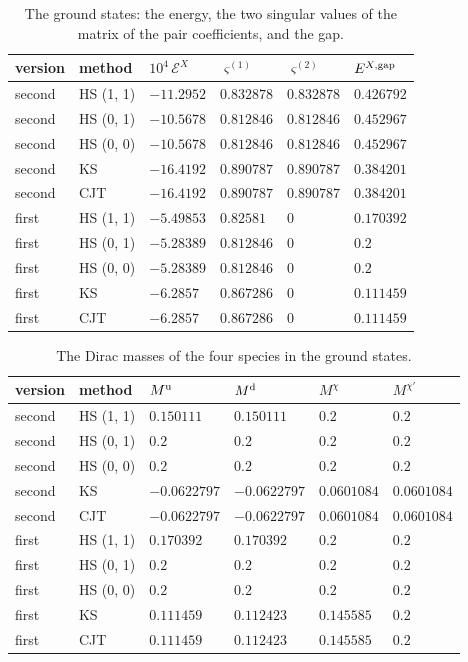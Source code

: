 \documentclass[aps,prd,onecolumn,superscriptaddress,nofootinbib,floatfix,longbibliography]{revtex4-2}
\begin{document}
\begin{table}[!htbp]
\caption{\label{tab:ground}The ground states: the energy, the two singular values of the matrix of the pair coefficients, and the gap.}
\begingroup\centering\footnotesize\setlength{\tabcolsep}{4pt}
\begin{tabular}{llllll}
\hline\hline
version & method & $10^4\,\mathcal E^X$ & $\varsigma^{(1)}$ & $\varsigma^{(2)}$ & $E^{X,{\rm gap}}$ \\ \hline
second & HS (1, 1) & $-11.2952$ & $0.832878$ & $0.832878$ & $0.426792$ \\
second & HS (0, 1) & $-10.5678$ & $0.812846$ & $0.812846$ & $0.452967$ \\
second & HS (0, 0) & $-10.5678$ & $0.812846$ & $0.812846$ & $0.452967$ \\
second & KS & $-16.4192$ & $0.890787$ & $0.890787$ & $0.384201$ \\
second & CJT & $-16.4192$ & $0.890787$ & $0.890787$ & $0.384201$ \\
first & HS (1, 1) & $-5.49853$ & $0.82581$ & $0$ & $0.170392$ \\
first & HS (0, 1) & $-5.28389$ & $0.812846$ & $0$ & $0.2$ \\
first & HS (0, 0) & $-5.28389$ & $0.812846$ & $0$ & $0.2$ \\
first & KS & $-6.2857$ & $0.867286$ & $0$ & $0.111459$ \\
first & CJT & $-6.2857$ & $0.867286$ & $0$ & $0.111459$ \\
\hline\hline
\end{tabular}\par
\endgroup
\end{table}

\begin{table}[!htbp]
\caption{\label{tab:sfmasses}The Dirac masses of the four species in the ground states.}
\begingroup\centering\footnotesize\setlength{\tabcolsep}{4pt}
\begin{tabular}{llllll}
\hline\hline
version & method & $M^{\rm u}$ & $M^{\rm d}$ & $M^\chi$ & $M^{\chi'}$ \\ \hline
second & HS (1, 1) & $0.150111$ & $0.150111$ & $0.2$ & $0.2$ \\
second & HS (0, 1) & $0.2$ & $0.2$ & $0.2$ & $0.2$ \\
second & HS (0, 0) & $0.2$ & $0.2$ & $0.2$ & $0.2$ \\
second & KS & $-0.0622797$ & $-0.0622797$ & $0.0601084$ & $0.0601084$ \\
second & CJT & $-0.0622797$ & $-0.0622797$ & $0.0601084$ & $0.0601084$ \\
first & HS (1, 1) & $0.170392$ & $0.170392$ & $0.2$ & $0.2$ \\
first & HS (0, 1) & $0.2$ & $0.2$ & $0.2$ & $0.2$ \\
first & HS (0, 0) & $0.2$ & $0.2$ & $0.2$ & $0.2$ \\
first & KS & $0.111459$ & $0.112423$ & $0.145585$ & $0.2$ \\
first & CJT & $0.111459$ & $0.112423$ & $0.145585$ & $0.2$ \\
\hline\hline
\end{tabular}\par
\endgroup
\end{table}
\end{document}
